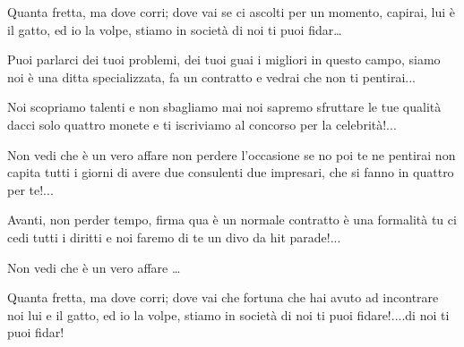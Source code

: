 
\beginverse

Quanta fretta, ma dove corri; dove vai
se ci ascolti per un momento, capirai,
lui è il gatto, ed io la volpe, stiamo in società
di noi ti puoi fidar\dots

\endverse

\chordsoff 

\beginverse

Puoi parlarci dei tuoi problemi, dei tuoi guai
i migliori in questo campo, siamo noi
è una ditta specializzata, fa un contratto e vedrai che non ti pentirai... 

\endverse

\beginverse

Noi scopriamo talenti e non sbagliamo mai noi sapremo sfruttare le tue qualità
dacci solo quattro monete e ti iscriviamo al concorso
per la celebrità!... 

\endverse

\chordson

\beginchorus

Non vedi che è un vero affare
non perdere l'occasione
se no poi te ne pentirai
non capita tutti i giorni
di avere due consulenti
due impresari, che si fanno
in quattro per te!... 

\endchorus

\chordsoff

\beginverse

Avanti, non perder tempo, firma qua
è un normale contratto è una formalità
tu ci cedi tutti i diritti
e noi faremo di te
un divo da hit parade!... 

\endverse

\beginchorus

Non vedi che è un vero affare \dots

\endchorus

\beginverse

Quanta fretta, ma dove corri; dove vai
che fortuna che hai avuto ad incontrare noi
lui e il gatto, ed io la volpe, stiamo in società
di noi ti puoi fidare!....di noi ti puoi fidar! 

\endverse

\endsong

